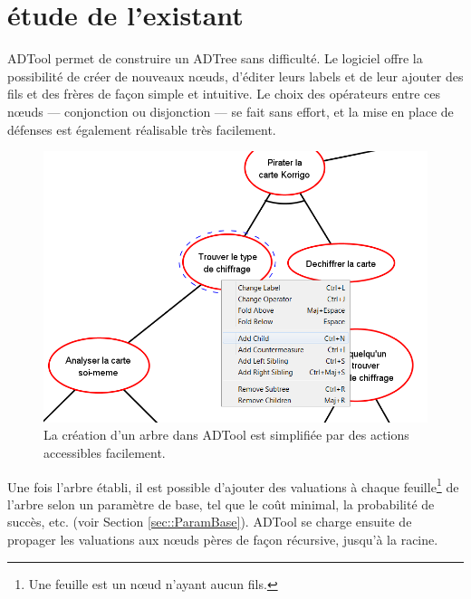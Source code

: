 \section{étude de l'existant}
	\label{sec:adtool}


	ADTool permet de construire un ADTree sans difficulté. Le logiciel offre la possibilité de créer de nouveaux nœuds, d'éditer leurs labels et de leur ajouter des fils et des frères de façon simple et intuitive. Le choix des opérateurs entre ces nœuds --- conjonction ou disjonction ---  se fait sans effort, et la mise en place de défenses est également réalisable très facilement. %
	
	\begin{figure}[h]
            \centering
            \includegraphics[width=1\textwidth]{figure/adtool_add_child.png}
            \caption{La création d'un arbre dans ADTool est simplifiée par des actions accessibles facilement.}
            \label{fig:arbre_exemple_1}
    \end{figure}
	
	Une fois l'arbre établi, il est possible d'ajouter des valuations à chaque feuille\footnote{Une feuille est un nœud n'ayant aucun fils.} de l'arbre selon un paramètre de base, tel que le coût minimal, la probabilité de succès, etc. (voir Section \ref{sec::ParamBase}). ADTool se charge ensuite de propager les valuations aux nœuds pères de façon récursive, jusqu'à la racine. %
	

